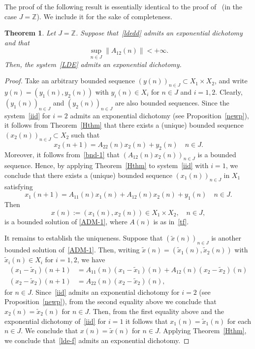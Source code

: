 \documentclass[11pt,reqno,a4paper]{amsart}
\theoremstyle{plain}
\numberwithin{equation}{section}
\newtheorem{theorem}{Theorem}
\theoremstyle{remark}
\def\Z{\mathbb{Z}}
\begin{document}
The proof of the following result is essentially identical to the proof of~\cite[Theorem 4]{DP} (in the case $J=\Z$). We include it for the sake of completeness. 
\begin{theorem}\label{T1}
Let $J=\mathbb Z$.
Suppose that~\eqref{ldedd} admits an exponential dichotomy and that 
\begin{equation}\label{bnd-1}
    \sup_{n\in J}\|A_{12}(n)\|<+\infty.
\end{equation}
Then, the system~\eqref{LDE} admits an exponential dichotomy.
\end{theorem}

\begin{proof}
Take an arbitrary bounded sequence $(y(n))_{n\in J}\subset X_1\times X_2$, and write $y(n)=(y_1(n), y_2(n))$ with $y_i(n)\in X_i$ for $n\in J$ and $i=1, 2$.
Clearly, $(y_1(n))_{n\in J}$ and $(y_2(n))_{n\in J}$ are also bounded sequences. Since the system~\eqref{iid} for $i=2$ admits an exponential dichotomy (see Proposition~\ref{newp}), it follows from Theorem~\ref{Hthm} that there exists a  (unique) bounded sequence $(x_2(n))_{n\in J}\subset X_2$ such that
\begin{equation}\label{po}
x_2(n+1)=A_{22}(n)x_2(n)+y_2(n) \quad n\in J.
\end{equation}
Moreover, it follows from~\eqref{bnd-1}  that $(A_{12}(n)x_2(n))_{n\in J}$ is a bounded sequence. Hence, by applying Theorem~\ref{Hthm} to system~\eqref{iid} with $i=1$, we conclude that there exists a 
(unique) bounded sequence $(x_1(n))_{n\in J}$ in $X_1$ satisfying
\begin{equation}\label{po2}
x_1(n+1)=A_{11}(n)x_1(n)+A_{12}(n)x_2(n)+y_1(n) \quad n\in J.
\end{equation}
Then
\[
x(n):=(x_1(n), x_2(n))\in X_1\times X_2, \quad n\in J,
\]
is a bounded solution of \eqref{ADM-1}, where $A(n)$ is as in~\eqref{tf}.

It remains to establish the uniqueness. Suppose that $(\tilde x(n))_{n\in J}$ is another bounded solution of~\eqref{ADM-1}. Then, writing $\tilde{x}(n)=(\tilde{x}_1(n), \tilde{x}_2(n))$ with $\tilde{x}_i(n)\in X_i$ for $i=1, 2$, we have
\[
\begin{split}
(x_1-\tilde{x}_1)(n+1)&=A_{11}(n)(x_1-\tilde{x}_1)(n)+A_{12}(n)(x_2-\tilde{x}_2)(n) \\ (x_2-\tilde{x}_2)(n+1)&=A_{22}(n)(x_2-\tilde{x}_2)(n),
\end{split}
\]
for $n\in J$.
Since~\eqref{iid} admits an exponential dichotomy for $i=2$ (see Proposition~\ref{newp}), from the second equality above we conclude that $x_2(n)=\tilde{x}_2(n)$ for $n\in J$. Then, from the first equality above and the exponential dichotomy of~\eqref{iid} for $i=1$ it follows that $x_1(n)=\tilde{x}_1(n)$ for each $n\in J$. We conclude that $x(n)=\tilde{x}(n)$ for $n\in J$.
Applying Theorem~\ref{Hthm}, we conclude that~\eqref{lde-f} admits an exponential dichotomy.
\end{proof}
\end{document}

